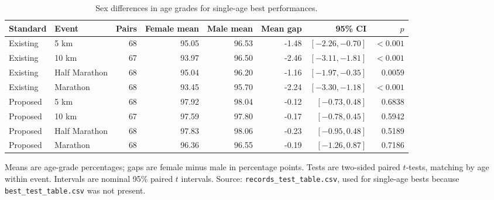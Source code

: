 \begin{table}[htbp]
\centering
\small
\caption{Sex differences in age grades for single-age best performances.}
\label{tab:best-test-table}
\setlength{\tabcolsep}{4pt}
\begin{tabular}{llrrrrrr}
\toprule
Standard & Event & Pairs & Female mean & Male mean & Mean gap & 95\% CI & $p$ \\
\midrule
Existing & 5 km & 68 & 95.05 & 96.53 & -1.48 & $[-2.26, -0.70]$ & $<0.001$ \\
Existing & 10 km & 67 & 93.97 & 96.50 & -2.46 & $[-3.11, -1.81]$ & $<0.001$ \\
Existing & Half Marathon & 68 & 95.04 & 96.20 & -1.16 & $[-1.97, -0.35]$ & 0.0059 \\
Existing & Marathon & 68 & 93.45 & 95.70 & -2.24 & $[-3.30, -1.18]$ & $<0.001$ \\
Proposed & 5 km & 68 & 97.92 & 98.04 & -0.12 & $[-0.73, 0.48]$ & 0.6838 \\
Proposed & 10 km & 67 & 97.59 & 97.80 & -0.17 & $[-0.78, 0.45]$ & 0.5942 \\
Proposed & Half Marathon & 68 & 97.83 & 98.06 & -0.23 & $[-0.95, 0.48]$ & 0.5189 \\
Proposed & Marathon & 68 & 96.36 & 96.55 & -0.19 & $[-1.26, 0.87]$ & 0.7186 \\
\bottomrule
\end{tabular}
\par\medskip
\begin{minipage}{\textwidth}
\footnotesize
Means are age-grade percentages; gaps are female minus male in percentage points. Tests are two-sided paired $t$-tests, matching by age within event. Intervals are nominal 95\% paired $t$ intervals. Source: \texttt{records\_test\_table.csv}, used for single-age bests because \texttt{best\_test\_table.csv} was not present.
\end{minipage}
\end{table}
